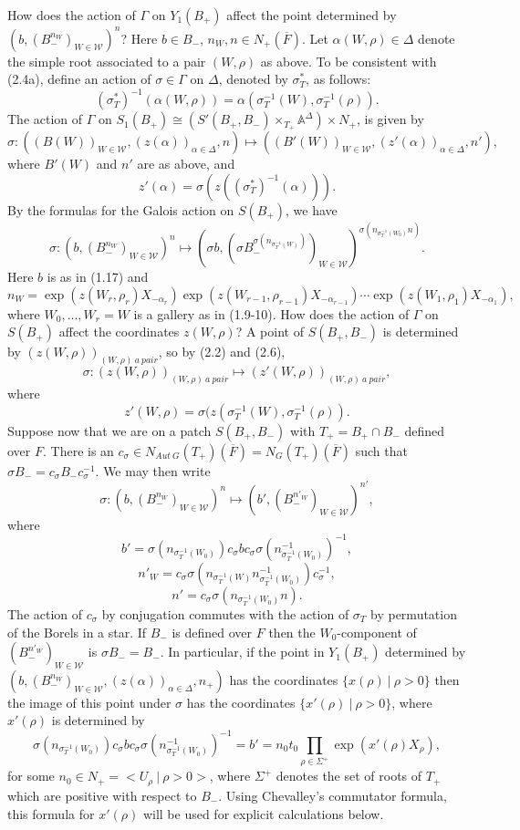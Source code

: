 \documentclass[12pt,letterpaper]{amsart}
\newcommand{\ovF}{\overline{F}}
\newcommand{\aaa}{\mathbb{A}}
\begin{document}
How does the action of $\Gamma$ on $Y_1(B_+)$ affect the
point determined by $(b,(B_-^{n_W})_{W\in{\mathcal W}})^{n}$?
Here $b\in B_-$, $n_W,n\in N_+(\ovF)$.
Let $\alpha(W,\rho)\in\Delta$ denote the simple root associated to
a pair $(W,\rho)$ as above.
To be consistent with (2.4a), define an action of $\sigma\in\Gamma$
on $\Delta$, denoted by $\sigma_T^*$, as follows:
\[
(\sigma_T^*)^{-1}(\alpha(W,\rho))
=\alpha(\sigma_T^{-1}(W),\sigma_T^{-1}(\rho)).
\tag{2.5}
\]
The action of $\Gamma$ on
$S_1(B_+)\cong (S'(B_+,B_-)\times_{T_+}\aaa^\Delta)\times N_+$,
is given by
\[
\sigma:((B(W))_{W\in{\mathcal W}},(z(\alpha))_{\alpha\in \Delta},n)\longmapsto
((B'(W))_{W\in{\mathcal W}},(z'(\alpha))_{\alpha\in \Delta},n'),
\]
where $B'(W)$ and $n'$ are as above, and
\[
z'(\alpha)=\sigma(z((\sigma_T^*)^{-1}(\alpha))).
\]
By the formulas
for the Galois action on $S(B_+)$, we have
\[
\sigma:(b,(B_-^{n_W})_{W\in{\mathcal W}})^{n}\longmapsto
(\sigma b,(\sigma B_-^{\sigma (n_{\sigma^{-1}_T (W)})}
)_{W\in{\mathcal W}})^{\sigma(n_{\sigma^{-1}_T (W_0)}n)}.
\tag{2.6}
\]
Here $b$ is as in (1.17) and
\[
n_W=\exp (z(W_r,\rho_r)X_{-\alpha_r})
\exp (z(W_{r-1},\rho_{r-1})X_{-\alpha_{r-1}})\cdots
\exp (z(W_1,\rho_1)X_{-\alpha_1}),
\]
where $W_0,...,W_r=W$ is a gallery as in (1.9-10).
How does the action of $\Gamma$ on $S(B_+)$ affect the coordinates
$z(W,\rho)$? A point of $S(B_+,B_-)$ is determined by
$(z(W,\rho))_{(W,\rho)\ a \ pair}$, so by (2.2) and (2.6),
\[
\sigma:(z(W,\rho))_{(W,\rho)\ a\ pair}\longmapsto
(z'(W,\rho))_{(W,\rho)\ a\ pair},
\]
where
\[
z'(W,\rho)=\sigma(z(\sigma_T^{-1}(W),\sigma_T^{-1}(\rho)).
\tag{2.7}
\]
Suppose now that we are on a patch $S(B_+,B_-)$ with
$T_+=B_+\cap B_-$ defined over $F$.
There is an $c_\sigma\in N_{Aut\ G}(T_+)(\ovF)=
N_G(T_+)(\ovF)$ such that
$\sigma B_-=c_\sigma B_-c_\sigma^{-1}$. We may then write
\[
\sigma:(b,(B_-^{n_W})_{W\in{\mathcal W}})^{n}\longmapsto
(b',(B_-^{n'_W})_{W\in{\mathcal W}})^{n'},
\tag{2.8}
\]
where
\[
b'= \sigma({n_{\sigma^{-1}_T (W_0)}})c_\sigma b
c_\sigma\sigma({n^{-1}_{\sigma^{-1}_T (W_0)}})^{-1},
\]
\[
n'_W=c_\sigma
\sigma(n_{\sigma^{-1}_T (W)}n^{-1}_{\sigma^{-1}_T (W_0)})c_\sigma^{-1},
\]
\[
n'= c_\sigma \sigma(n_{\sigma^{-1}_T (W_0)}n).
\]
The action of $c_\sigma$ by conjugation commutes with the action of
$\sigma_T$ by permutation of the Borels in a star.
If $B_-$ is defined over $F$ then the
$W_0$-component of $(B_-^{n'_W})_{W\in{\mathcal W}}$ is
$\sigma B_-=B_-$. In particular, if the point in $Y_1(B_+)$
determined by $(b,(B_-^{n_W})_{W\in{\mathcal W}},
(z(\alpha))_{\alpha\in\Delta},{n_+})$ has the
coordinates $\{x(\rho)\ |\ \rho >0\}$ then the image of this point
under $\sigma$ has the coordinates $\{x'(\rho)\ |\ \rho >0\}$,
where $x'(\rho)$ is determined by
\[
\sigma({n_{\sigma^{-1}_T (W_0)}})c_\sigma b
c_\sigma\sigma({n^{-1}_{\sigma^{-1}_T (W_0)}})^{-1}
=b'=n_0t_0\prod_{\rho\in\Sigma^+}\exp (x'(\rho)X_\rho),
\tag{2.9}
\]
for some $n_0\in N_+=<U_\rho\ |\ \rho>0>$,
where $\Sigma^+$ denotes the set of roots of $T_+$
which are positive with respect to $B_-$.
Using Chevalley's commutator formula, this formula for
$x'(\rho)$ will be used for explicit calculations below.
\end{document}
